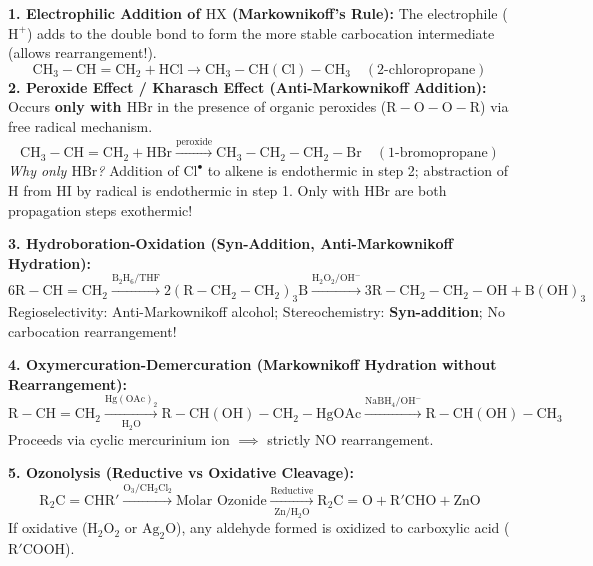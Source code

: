 \documentclass[10pt,a4paper]{article}
\begin{document}
\begin{formulabox}
\textbf{1. Electrophilic Addition of $\mathrm{HX}$ (Markownikoff's Rule):}
The electrophile ($\mathrm{H}^+$) adds to the double bond to form the more stable carbocation intermediate (allows rearrangement!).
\begin{equation}
  \mathrm{CH_3-CH=CH_2} + \mathrm{HCl} \longrightarrow \mathrm{CH_3-CH(Cl)-CH_3} \quad (2\text{-chloropropane})
\end{equation}
\textbf{2. Peroxide Effect / Kharasch Effect (Anti-Markownikoff Addition):}
Occurs \textbf{only with $\mathrm{HBr}$} in the presence of organic peroxides ($\mathrm{R-O-O-R}$) via free radical mechanism.
\begin{equation}
  \mathrm{CH_3-CH=CH_2} + \mathrm{HBr} \xrightarrow{\text{peroxide}} \mathrm{CH_3-CH_2-CH_2-Br} \quad (1\text{-bromopropane})
\end{equation}
\textit{Why only $\mathrm{HBr}$?} Addition of $\mathrm{Cl}^\bullet$ to alkene is endothermic in step 2; abstraction of $\mathrm{H}$ from $\mathrm{HI}$ by radical is endothermic in step 1. Only with $\mathrm{HBr}$ are both propagation steps exothermic!

\textbf{3. Hydroboration-Oxidation (Syn-Addition, Anti-Markownikoff Hydration):}
\begin{equation}
  6\mathrm{R-CH=CH_2} \xrightarrow{\mathrm{B_2H_6 / THF}} 2(\mathrm{R-CH_2-CH_2})_3\mathrm{B} \xrightarrow{\mathrm{H_2O_2 / OH^-}} 3\mathrm{R-CH_2-CH_2-OH} + \mathrm{B(OH)}_3
\end{equation}
Regioselectivity: Anti-Markownikoff alcohol; Stereochemistry: \textbf{Syn-addition}; No carbocation rearrangement!

\textbf{4. Oxymercuration-Demercuration (Markownikoff Hydration without Rearrangement):}
\begin{equation}
  \mathrm{R-CH=CH_2} \xrightarrow[\mathrm{H_2O}]{\mathrm{Hg(OAc)_2}} \mathrm{R-CH(OH)-CH_2-HgOAc} \xrightarrow{\mathrm{NaBH_4 / OH^-}} \mathrm{R-CH(OH)-CH_3}
\end{equation}
Proceeds via cyclic mercurinium ion $\implies$ strictly NO rearrangement.

\textbf{5. Ozonolysis (Reductive vs Oxidative Cleavage):}
\begin{equation}
  \mathrm{R_2C=CHR'} \xrightarrow{\mathrm{O_3 / CH_2Cl_2}} \text{Molar Ozonide} \xrightarrow[\mathrm{Zn / H_2O}]{\text{Reductive}} \mathrm{R_2C=O} + \mathrm{R'CHO} + \mathrm{ZnO}
\end{equation}
If oxidative ($\mathrm{H_2O_2}$ or $\mathrm{Ag_2O}$), any aldehyde formed is oxidized to carboxylic acid ($\mathrm{R'COOH}$).
\end{formulabox}
\end{document}
